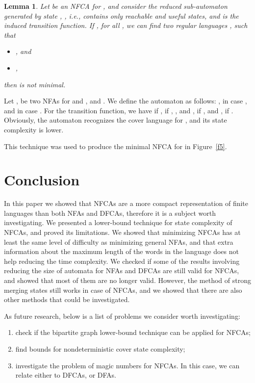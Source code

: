 \documentclass[submission,copyright,creativecommons]{eptcs}
\newtheorem{lemma}{Lemma}
\newenvironment{proof}[1][Proof]{\begin{trivlist}
\item[\hskip \labelsep {\bfseries #1}]}{\end{trivlist}}
\begin{document}
\begin{lemma}
Let  be an NFCA for , and consider the reduced sub-automaton
generated by state , , i.e.,   
contains only reachable and useful states, and  is the induced transition function.
If , for all , we can find two regular languages , such that
\begin{itemize}
 \item , and
 \item ,
\end{itemize}
then  is not minimal.
\end{lemma}
\begin{proof}
Let ,  be two NFAs
for  and , and  .
We define the automaton  as follows:
, in case , 
and  in case .
For the transition function, we have  if ,
 if , ,
and
, if ,
and , if .
Obviously, the automaton  recognizes the cover language for , 
and its state complexity is lower.
\end{proof}
This technique was used to produce the minimal NFCA for  in Figure~\ref{f5}.

\section{Conclusion}
\label{openproblems}
In this paper we showed that NFCAs are a more compact representation of finite languages than both 
NFAs and DFCAs, therefore it is a subject worth investigating.
We presented a lower-bound technique for state complexity of NFCAs, and proved its limitations.
We showed that minimizing NFCAs has at least the same level of difficulty as minimizing 
general NFAs, and that extra information about the maximum length of the words in the language 
does not help reducing the time complexity.
We checked if some of the results involving reducing the size of automata for NFAs and DFCAs
are still valid for NFCAs, and showed that most of them are no longer valid. 
However, the method of strong merging states still works in case of NFCAs, and we showed 
that there are also other methods that could be investigated.

As future research, below is a list of problems we consider worth investigating:
\begin{enumerate}
 \item check if the bipartite graph lower-bound
 technique can be applied for \mbox{NFCAs;}
 \item find bounds for nondeterministic cover state complexity;
 \item investigate the problem of magic numbers for NFCAs. 
In this case, we can relate either to DFCAs, or DFAs. 
\end{enumerate}




\end{document}
